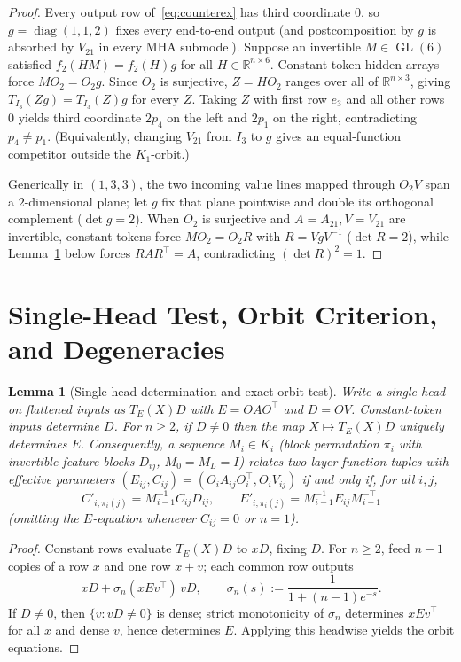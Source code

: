 \documentclass[11pt]{article}
\theoremstyle{plain}
\newtheorem{lemma}[theorem]{Lemma}
\theoremstyle{definition}
\theoremstyle{remark}
\DeclareMathOperator{\GL}{GL}
\DeclareMathOperator{\diag}{diag}
\begin{document}
\begin{proof}
Every output row of~\eqref{eq:counterex} has third coordinate $0$, so $g = \diag(1, 1, 2)$ fixes every end-to-end output (and postcomposition by $g$ is absorbed by $V_{21}$ in every MHA submodel). Suppose an invertible $M \in \GL(6)$ satisfied $f_2(HM) = f_2(H)g$ for all $H \in \mathbb{R}^{n \times 6}$. Constant-token hidden arrays force $M O_2 = O_2 g$. Since $O_2$ is surjective, $Z = H O_2$ ranges over all of $\mathbb{R}^{n \times 3}$, giving $T_{I_3}(Z g) = T_{I_3}(Z) g$ for every $Z$. Taking $Z$ with first row $e_3$ and all other rows $0$ yields third coordinate $2p_4$ on the left and $2p_1$ on the right, contradicting $p_4 \neq p_1$. (Equivalently, changing $V_{21}$ from $I_3$ to $g$ gives an equal-function competitor outside the $K_1$-orbit.)

Generically in $(1, 3, 3)$, the two incoming value lines mapped through $O_2 V$ span a $2$-dimensional plane; let $g$ fix that plane pointwise and double its orthogonal complement ($\det g = 2$). When $O_2$ is surjective and $A = A_{21}, V = V_{21}$ are invertible, constant tokens force $M O_2 = O_2 R$ with $R = V g V^{-1}$ ($\det R = 2$), while Lemma~\ref{lem:single} below forces $R A R^\top = A$, contradicting $(\det R)^2 = 1$.
\end{proof}

\section{Single-Head Test, Orbit Criterion, and Degeneracies}

\begin{lemma}[Single-head determination and exact orbit test]\label{lem:single}
Write a single head on flattened inputs as $T_E(X) D$ with $E = O A O^\top$ and $D = O V$. Constant-token inputs determine $D$. For $n \ge 2$, if $D \neq 0$ then the map $X \mapsto T_E(X) D$ uniquely determines $E$. Consequently, a sequence $M_i \in K_i$ (block permutation $\pi_i$ with invertible feature blocks $D_{ij}$, $M_0 = M_L = I$) relates two layer-function tuples with effective parameters $(E_{ij}, C_{ij}) = (O_i A_{ij} O_i^\top, O_i V_{ij})$ if and only if, for all $i, j$,
\[
C'_{i, \pi_i(j)} = M_{i-1}^{-1} C_{ij} D_{ij}, \qquad
E'_{i, \pi_i(j)} = M_{i-1}^{-1} E_{ij} M_{i-1}^{-\top}
\]
(omitting the $E$-equation whenever $C_{ij} = 0$ or $n = 1$).
\end{lemma}

\begin{proof}
Constant rows evaluate $T_E(X)D$ to $xD$, fixing $D$. For $n \ge 2$, feed $n - 1$ copies of a row $x$ and one row $x + v$; each common row outputs
\[
x D + \sigma_n(x E v^\top)\, v D, \qquad
\sigma_n(s) := \frac{1}{1 + (n - 1)e^{-s}}.
\]
If $D \neq 0$, then $\{v : vD \neq 0\}$ is dense; strict monotonicity of $\sigma_n$ determines $x E v^\top$ for all $x$ and dense $v$, hence determines $E$. Applying this headwise yields the orbit equations.
\end{proof}
\end{document}
